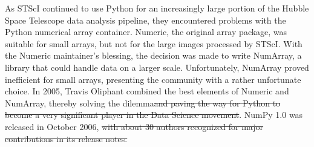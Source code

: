 \documentclass[fleqn,10pt]{wlscirep}
\providecommand{\DIFdel}[1]{{\protect\color{red}\sout{#1}}}                      %
\providecommand{\DIFdelbegin}{} %
\providecommand{\DIFdelend}{} %
\begin{document}
\DIFdelend As STScI continued to use Python for an increasingly large portion
of the Hubble Space Telescope data analysis pipeline, they encountered
problems with the Python numerical array container.
Numeric, the original array package, was
suitable for small arrays, but not for the large images processed by
STScI\@.  With the Numeric maintainer's blessing, the decision was made
to write NumArray\cite{greenfield2003numarray}, a library that could handle data on a larger
scale.  Unfortunately, NumArray proved inefficient for small arrays,
presenting the community with a rather unfortunate choice.  In 2005,
Travis Oliphant combined the best elements of Numeric and NumArray,
thereby solving the dilemma\DIFdelbegin \DIFdel{and paving the way for Python to become
a very significant player in the Data Science movement}\DIFdelend . NumPy 1.0 was released in October
2006\cite{numpy-1.0-tag}, \DIFdelbegin \DIFdel{with about 30
authors recognized for major contributions in its release notes.
}%
\end{document}
